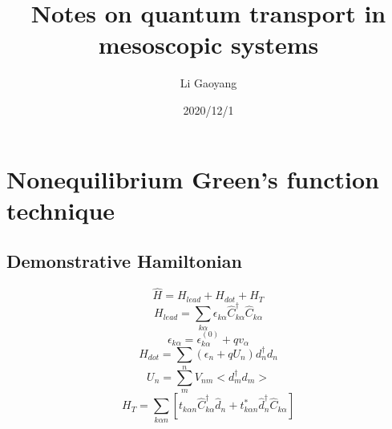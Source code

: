 \documentclass[aps,prb,superscriptaddress]{revtex4-2}
\begin{document}
\title{Notes on quantum transport in mesoscopic systems}
\author{Li Gaoyang}
\date{2020/12/1}
\maketitle

\section{Nonequilibrium Green's function technique}
\subsection{Demonstrative Hamiltonian}
\begin{equation}
\hat{H}=H_{l e a d}+H_{d o t}+H_{T}
\end{equation}
\begin{equation}
H_{l e a d}=\sum_{k \alpha} \epsilon_{k \alpha} \hat{C}_{k \alpha}^{\dagger} \hat{C}_{k \alpha}
\end{equation}
\begin{equation}
\epsilon_{k \alpha}=\epsilon_{k \alpha}^{(0)}+q v_{\alpha}
\end{equation}
\begin{equation}
H_{d o t}=\sum_{n}\left(\epsilon_{n}+q U_{n}\right) d_{n}^{\dagger} d_{n}
\end{equation}
\begin{equation}
U_{n}=\sum_{m} V_{n m}<d_{m}^{\dagger} d_{m}>
\end{equation}
\begin{equation}
H_{T}=\sum_{k \alpha n}\left[t_{k \alpha n} \hat{C}_{k \alpha}^{\dagger} \hat{d}_{n}+t_{k \alpha n}^{*} \hat{d}_{n}^{\dagger} \hat{C}_{k \alpha}\right]
\end{equation}
\end{document}
